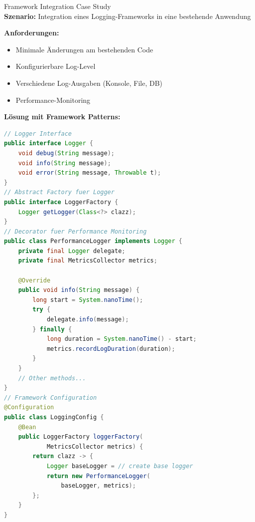 \begin{example2}{Framework Integration Case Study}\\
\textbf{Szenario:}
Integration eines Logging-Frameworks in eine bestehende Anwendung

\textbf{Anforderungen:}
\begin{itemize}
    \item Minimale Änderungen am bestehenden Code
    \item Konfigurierbare Log-Level
    \item Verschiedene Log-Ausgaben (Konsole, File, DB)
    \item Performance-Monitoring
\end{itemize}

\textbf{Lösung mit Framework Patterns:}
\begin{lstlisting}[language=Java, style=basesmol]
// Logger Interface
public interface Logger {
    void debug(String message);
    void info(String message);
    void error(String message, Throwable t);
}
// Abstract Factory fuer Logger
public interface LoggerFactory {
    Logger getLogger(Class<?> clazz);
}
// Decorator fuer Performance Monitoring
public class PerformanceLogger implements Logger {
    private final Logger delegate;
    private final MetricsCollector metrics;
    
    @Override
    public void info(String message) {
        long start = System.nanoTime();
        try {
            delegate.info(message);
        } finally {
            long duration = System.nanoTime() - start;
            metrics.recordLogDuration(duration);
        }
    }
    // Other methods...
}
// Framework Configuration
@Configuration
public class LoggingConfig {
    @Bean
    public LoggerFactory loggerFactory(
            MetricsCollector metrics) {
        return clazz -> {
            Logger baseLogger = // create base logger
            return new PerformanceLogger(
                baseLogger, metrics);
        };
    }
}
\end{lstlisting}
\end{example2}

\columnbreak

